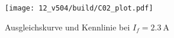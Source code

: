 \begin{figure}
    \centering
    \texttt{[image: 12\_v504/build/C02\_plot.pdf]}
    \caption{Ausgleichskurve und Kennlinie bei $I_f = \qty{2.3}{\ampere}$}
    \label{fig:c02}
\end{figure}